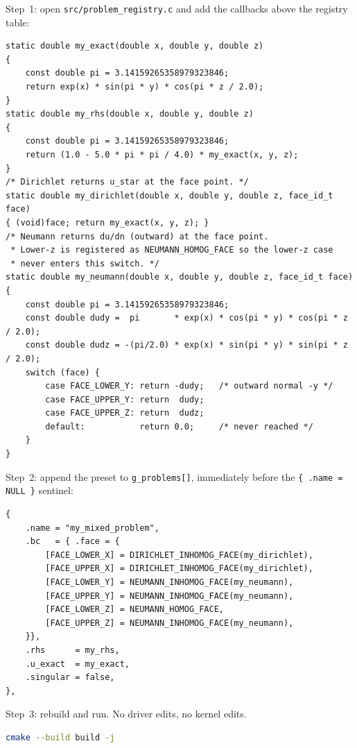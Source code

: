\documentclass[11pt]{article}
\theoremstyle{definition}
\begin{document}
Step~1: open \texttt{src/problem\_registry.c} and add the callbacks
above the registry table:
\begin{lstlisting}
static double my_exact(double x, double y, double z)
{
    const double pi = 3.14159265358979323846;
    return exp(x) * sin(pi * y) * cos(pi * z / 2.0);
}
static double my_rhs(double x, double y, double z)
{
    const double pi = 3.14159265358979323846;
    return (1.0 - 5.0 * pi * pi / 4.0) * my_exact(x, y, z);
}
/* Dirichlet returns u_star at the face point. */
static double my_dirichlet(double x, double y, double z, face_id_t face)
{ (void)face; return my_exact(x, y, z); }
/* Neumann returns du/dn (outward) at the face point.
 * Lower-z is registered as NEUMANN_HOMOG_FACE so the lower-z case
 * never enters this switch. */
static double my_neumann(double x, double y, double z, face_id_t face)
{
    const double pi = 3.14159265358979323846;
    const double dudy =  pi       * exp(x) * cos(pi * y) * cos(pi * z / 2.0);
    const double dudz = -(pi/2.0) * exp(x) * sin(pi * y) * sin(pi * z / 2.0);
    switch (face) {
        case FACE_LOWER_Y: return -dudy;   /* outward normal -y */
        case FACE_UPPER_Y: return  dudy;
        case FACE_UPPER_Z: return  dudz;
        default:           return 0.0;     /* never reached */
    }
}
\end{lstlisting}

Step~2: append the preset to \texttt{g\_problems[]}, immediately before
the \verb|{ .name = NULL }| sentinel:
\begin{lstlisting}
{
    .name = "my_mixed_problem",
    .bc   = { .face = {
        [FACE_LOWER_X] = DIRICHLET_INHOMOG_FACE(my_dirichlet),
        [FACE_UPPER_X] = DIRICHLET_INHOMOG_FACE(my_dirichlet),
        [FACE_LOWER_Y] = NEUMANN_INHOMOG_FACE(my_neumann),
        [FACE_UPPER_Y] = NEUMANN_INHOMOG_FACE(my_neumann),
        [FACE_LOWER_Z] = NEUMANN_HOMOG_FACE,
        [FACE_UPPER_Z] = NEUMANN_INHOMOG_FACE(my_neumann),
    }},
    .rhs      = my_rhs,
    .u_exact  = my_exact,
    .singular = false,
},
\end{lstlisting}

Step~3: rebuild and run.  No driver edits, no kernel edits.
\begin{lstlisting}[language=bash]
cmake --build build -j
\end{lstlisting}
\end{document}
